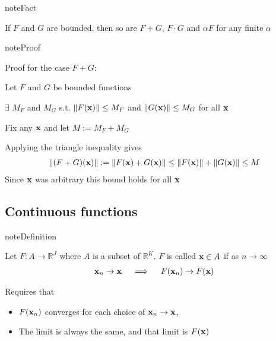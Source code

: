 \documentclass[letterpaper,10pt,english]{jupyterBook}
\begin{document}
\begin{sphinxadmonition}{note}{Fact}

\sphinxAtStartPar
If \(F\) and \(G\) are bounded, then so are \(F+G\), \(F \cdot G\) and \(\alpha F\) for any finite \(\alpha\)
\end{sphinxadmonition}

\begin{sphinxadmonition}{note}{Proof}

\sphinxAtStartPar
Proof for the case \(F + G\):

\sphinxAtStartPar
Let \(F\) and \(G\) be bounded functions

\sphinxAtStartPar
\(\exists\) \(M_F\) and \(M_G\) s.t.
\(\| F({\bf x}) \| \leq M_F\) and \(\| G({\bf x}) \| \leq M_G\)
for all \({\bf x}\)

\sphinxAtStartPar
Fix any \({\bf x}\) and let \(M := M_F + M_G\)

\sphinxAtStartPar
Applying the triangle inequality gives
\begin{equation*}
\begin{split}
%
\| (F + G)({\bf x}) \|
:= \| F({\bf x}) + G({\bf x}) \|
\leq \| F({\bf x}) \| + \| G({\bf x}) \| 
\leq M
%
\end{split}
\end{equation*}
\sphinxAtStartPar
Since \({\bf x}\) was arbitrary this bound holds for all \({\bf x}\)
\end{sphinxadmonition}


\subsection{Continuous functions}
\label{\detokenize{06.optimization_fundamentals:continuous-functions}}
\begin{sphinxadmonition}{note}{Definition}

\sphinxAtStartPar
Let \(F \colon A \to \mathbb{R}^J\) where \(A\) is a subset of \(\mathbb{R}^K\).
\(F\) is called  \({\bf x} \in A\) if as \(n \to \infty\)
\begin{equation*}
\begin{split}
%
{\bf x}_n \to {\bf x}
\quad \implies \quad
F({\bf x}_n) \to F({\bf x}) 
%
\end{split}
\end{equation*}\end{sphinxadmonition}

\sphinxAtStartPar
Requires that
\begin{itemize}
\item {} 
\sphinxAtStartPar
\(F({\bf x}_n)\) converges for each choice of \({\bf x}_n \to {\bf x}\),

\item {} 
\sphinxAtStartPar
The limit is always the same, and that limit is \(F({\bf x})\)

\end{itemize}
\end{document}
